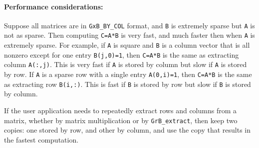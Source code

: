 \documentclass[12pt]{article}
\begin{document}
\paragraph{\bf Performance considerations:}
Suppose all matrices are in \verb'GxB_BY_COL' format, and \verb'B' is extremely
sparse but \verb'A' is not as sparse.  Then computing \verb'C=A*B' is very
fast, and much faster then when \verb'A' is extremely sparse.  For example, if
\verb'A' is square and \verb'B' is a column vector that is all nonzero except
for one entry \verb'B(j,0)=1', then \verb'C=A*B' is the same as extracting
column \verb'A(:,j)'.  This is very fast if \verb'A' is stored by column but
slow if \verb'A' is stored by row.  If \verb'A' is a sparse row with a single
entry \verb'A(0,i)=1', then \verb'C=A*B' is the same as extracting row
\verb'B(i,:)'.  This is fast if \verb'B' is stored by row but slow if \verb'B'
is stored by column.

If the user application needs to repeatedly extract rows and columns from a
matrix, whether by matrix multiplication or by \verb'GrB_extract', then keep
two copies: one stored by row, and other by column, and use the copy that
results in the fastest computation.
\end{document}
